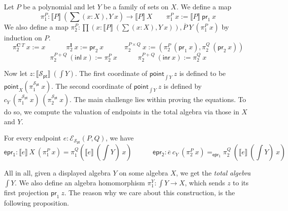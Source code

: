 \documentclass[9pt]{entcs}
\newcommand{\term}[1]{\mathsf{#1}}
\newcommand{\constructor}[1]{\mathbf{#1}}
\newcommand{\function}[1]{\mathsf{#1}}
\newcommand{\deprod}[3]{\prod(#1 : #2), #3} %
\newcommand{\desum}[3]{\sum(#1 : #2), #3} %
\newcommand{\0}{\textbf{0}} %
\newcommand{\inl}{\term{inl}} %
\newcommand{\inr}{\term{inr}} %
\newcommand{\prl}{\term{pr}_1} %
\newcommand{\prr}{\term{pr}_2} %
\newcommand{\depeq}[3]{#2 =_{#1} #3} %
\newcommand{\Def}{:=} %
\newcommand{\C}{\constructor{C}} %
\newcommand{\I}{\constructor{I}} %
\newcommand{\sumP}[2]{#1 + #2} %
\newcommand{\prodP}[2]{#1 \times #2} %
\newcommand{\ep}[3]{\mathcal{E}_{#1}(#2,#3)} %
\newcommand{\pt}[0]{\textsf{pt}}
\newcommand{\pointc}[1]{#1_{\pt}} %
\newcommand{\sig}{\mathcal{S}} %
\newcommand{\semP}[1]{\llbracket #1 \rrbracket} %
\newcommand{\semE}[1]{\llbracket #1 \rrbracket} %
\newcommand{\constrA}[1]{\function{point}_{#1}} %
\newcommand{\polydact}[2]{\overline{#1} \> #2} %
\newcommand{\epdact}[2]{\overline{#1} \> #2} %
\newcommand{\total}[1]{\int #1} %
\newcommand{\proj}[1]{\pi_1^{#1}} %
\newcommand{\Ppl}[1]{\pi_1^{#1}} %
\newcommand{\Ppr}[1]{\pi_2^{#1}} %
\newcommand{\Epl}{\function{epr_1}} %
\newcommand{\Epr}{\function{epr_2}} %
\newcommand{\remove}[1]{} %
\begin{document}
\begin{definition}
Let $P$ be a polynomial and let $Y$ be a family of sets on $X$.
We define a map
\[
\Ppl{P} : \semP{P} \> (\desum{x}{X}{Y \> x}) \rightarrow \semP{P} \> X
\quad \quad
\Ppl{P} \> x \Def \semP{P} \> \prl \> x
\]
We also define a map $\Ppr{P} : \deprod{x}{\semP{P} \> (\desum{x}{X}{Y \> x})}{\polydact{P}{Y} \> (\Ppl{P} \> x)}$ by induction on $P$.
\[
\Ppr{\C \> T} \> x  \Def x
\quad \quad \quad
\Ppr{\I} \> x \Def \prr \> x
\quad \quad \quad
\Ppr{\prodP{P}{Q}} \> x \Def (\Ppr{P} \> (\prl \> x) , \Ppr{Q} \> (\prr \> x))
\]
\[
\Ppr{\sumP{P}{Q}} \> (\inl \> x) \Def \Ppr{P} \> x
\quad \quad \quad
\Ppr{\sumP{P}{Q}} \> (\inr \> x) \Def \Ppr{Q} \> x
\]
\remove{
\begin{itemize}
	\item $\Ppr{\C \> T} \> x  \Def x$;
	\item $\Ppr{\I} \> x \Def \prr \> x$;
	\item $\Ppr{\sumP{P}{Q}} \> (\inl \> x) \Def \Ppr{P} \> x$;
	\item $\Ppr{\sumP{P}{Q}} \> (\inr \> x) \Def \Ppr{Q} \> x$;
	\item $\Ppr{\prodP{P}{Q}} \> x \Def (\Ppr{P} \> x , \Ppr{Q} \> (\prr \> x))$.
\end{itemize}
}
\end{definition}

Now let $z : \semP{\pointc{\sig}} \> (\total{Y})$.
The first coordinate of $\constrA{\total{Y}} \> z$ is defined to be $\constrA{X}(\Ppl{\pointc{\sig}} \> x)$.
The second coordinate of $\constrA{\total{Y}} \> z$ is defined by $c_Y \> (\Ppl{\pointc{\sig}} \> x) \> (\Ppr{\pointc{\sig}} \> x)$.
The main challenge lies within proving the equations.
To do so, we compute the valuation of endpoints in the total algebra via those in $X$ and $Y$.

\begin{lemma}
For every endpoint $e : \ep{\pointc{\sig}}{P}{Q}$, we have
\[
\Epl : \semE{e} \> X \> (\Ppl{P} \> x) = \Ppl{Q}(\semE{e} \> (\total{Y}) \> x) 
\quad \quad \quad
\Epr : \depeq{\Epl}{\epdact{e}{c_Y} \> (\Ppr{P} \> x)}{\Ppr{Q} \> (\semE{e} \> (\total{Y}) \> x)}
\]
\end{lemma}

All in all, given a displayed algebra $Y$ on some algebra $X$, we get the \emph{total algebra} $\total{Y}$.
We also define an algebra homomorphism $\proj{Y} : \total{Y} \rightarrow X$, which sends $z$ to its first projection $\prl \> z$.
The reason why we care about this construction, is the following proposition.
\end{document}
